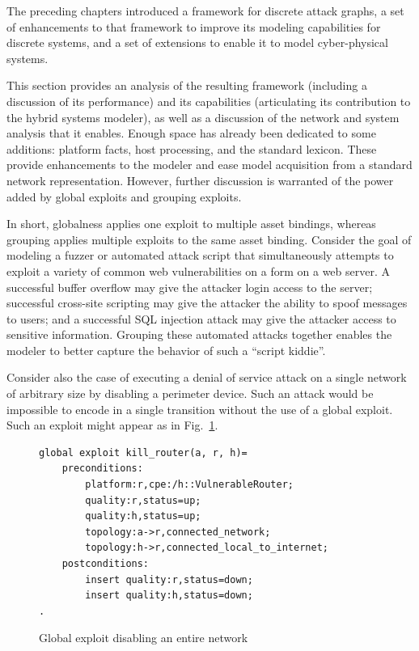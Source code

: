 The preceding chapters introduced a framework for discrete attack graphs,
a set of enhancements to that framework to improve its modeling capabilities for
discrete systems, and a set of extensions to enable it to model cyber-physical
systems.

This section provides an analysis of the resulting framework (including
a discussion of its performance) and its capabilities (articulating its
contribution to the hybrid systems modeler), as well as a discussion of the
network and system analysis that it enables.
Enough space has already been dedicated to some additions: platform
facts, host processing, and the standard lexicon. These provide enhancements
to the modeler and ease model acquisition from a standard network 
representation. However, further discussion is warranted of the power added
by global exploits and grouping exploits.

In short, globalness applies one exploit to multiple asset 
bindings, whereas grouping applies multiple exploits to the same asset binding.
Consider the goal of modeling a fuzzer or automated attack script that
simultaneously attempts to exploit a variety of common web vulnerabilities on
a form on a web server. A successful buffer overflow may give the attacker
login access to the server; successful cross-site scripting may give the
attacker the ability to spoof messages to users; and a successful SQL injection
attack may give the attacker access to sensitive information. Grouping these
automated attacks together enables the modeler to better capture the behavior
of such a ``script kiddie''.

Consider also the case of executing a denial of service attack on a single
network of arbitrary size by disabling a perimeter device. Such an attack would
be impossible to encode in a single transition without the use of a global
exploit. Such an exploit might appear as in Fig.~\ref{fig:network_dos_global}.

\begin{figure}
\begin{lstlisting}
global exploit kill_router(a, r, h)=
    preconditions:
        platform:r,cpe:/h::VulnerableRouter;
        quality:r,status=up;
        quality:h,status=up;
        topology:a->r,connected_network;
        topology:h->r,connected_local_to_internet;
    postconditions:
        insert quality:r,status=down;
        insert quality:h,status=down;
.
\end{lstlisting}
\caption{Global exploit disabling an entire network}
\label{fig:network_dos_global}
\end{figure}

